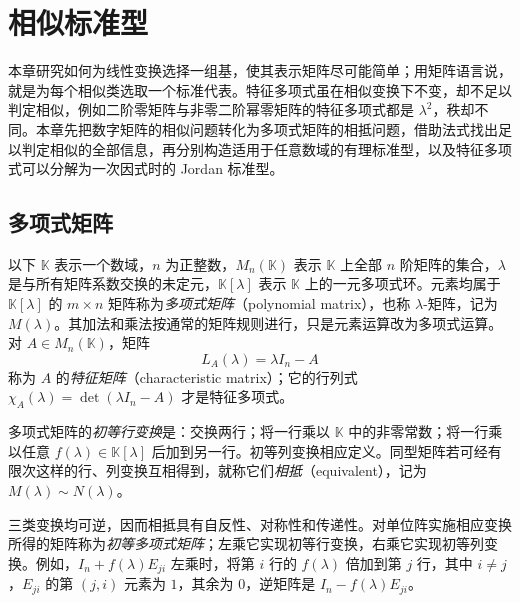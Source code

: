 \setcounter{chapter}{6} %
\chapter{相似标准型}
\label{chap:xie-similarity-canonical}

本章研究如何为线性变换选择一组基，使其表示矩阵尽可能简单；用矩阵语言说，就是为每个相似类选取一个标准代表。特征多项式虽在相似变换下不变，却不足以判定相似，例如二阶零矩阵与非零二阶幂零矩阵的特征多项式都是 $\lambda^2$，秩却不同。本章先把数字矩阵的相似问题转化为多项式矩阵的相抵问题，借助法式找出足以判定相似的全部信息，再分别构造适用于任意数域的有理标准型，以及特征多项式可以分解为一次因式时的 Jordan 标准型。

\section{多项式矩阵}
\label{sec:xie-polynomial-matrices}

以下 $\mathbb K$ 表示一个数域，$n$ 为正整数，$M_n(\mathbb K)$ 表示 $\mathbb K$ 上全部 $n$ 阶矩阵的集合，$\lambda$ 是与所有矩阵系数交换的未定元，$\mathbb K[\lambda]$ 表示 $\mathbb K$ 上的一元多项式环。元素均属于 $\mathbb K[\lambda]$ 的 $m\times n$ 矩阵称为\emph{多项式矩阵}（polynomial matrix），也称 $\lambda$-矩阵，记为 $M(\lambda)$。其加法和乘法按通常的矩阵规则进行，只是元素运算改为多项式运算。对 $A\in M_n(\mathbb K)$，矩阵
\[
    L_A(\lambda)=\lambda I_n-A
\]
称为 $A$ 的\emph{特征矩阵}（characteristic matrix）；它的行列式 $\chi_A(\lambda)=\det(\lambda I_n-A)$ 才是特征多项式。

\begin{definition}
\label{def:xie-polynomial-equivalence}
多项式矩阵的\emph{初等行变换}是：交换两行；将一行乘以 $\mathbb K$ 中的非零常数；将一行乘以任意 $f(\lambda)\in\mathbb K[\lambda]$ 后加到另一行。初等列变换相应定义。同型矩阵若可经有限次这样的行、列变换互相得到，就称它们\emph{相抵}（equivalent），记为 $M(\lambda)\sim N(\lambda)$。
\end{definition}

三类变换均可逆，因而相抵具有自反性、对称性和传递性。对单位阵实施相应变换所得的矩阵称为\emph{初等多项式矩阵}；左乘它实现初等行变换，右乘它实现初等列变换。例如，$I_n+f(\lambda)E_{ji}$ 左乘时，将第 $i$ 行的 $f(\lambda)$ 倍加到第 $j$ 行，其中 $i\ne j$，$E_{ji}$ 的第 $(j,i)$ 元素为 $1$，其余为 $0$，逆矩阵是 $I_n-f(\lambda)E_{ji}$。

